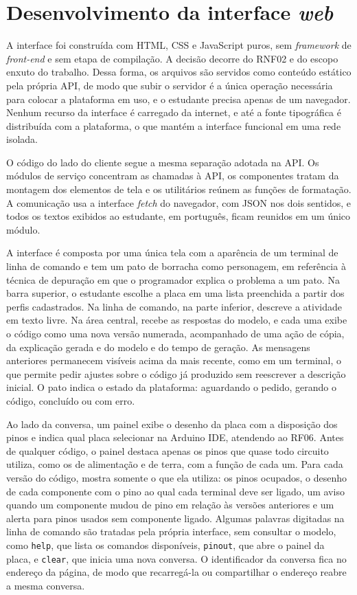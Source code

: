 \section{Desenvolvimento da interface \textit{web}}
\label{sec:method-web}

A interface foi construída com HTML, CSS e JavaScript puros, sem \textit{framework} de \textit{front-end} e sem etapa de compilação. A decisão decorre do RNF02 e do escopo enxuto do trabalho. Dessa forma, os arquivos são servidos como conteúdo estático pela própria API, de modo que subir o servidor é a única operação necessária para colocar a plataforma em uso, e o estudante precisa apenas de um navegador. Nenhum recurso da interface é carregado da internet, e até a fonte tipográfica é distribuída com a plataforma, o que mantém a interface funcional em uma rede isolada.

O código do lado do cliente segue a mesma separação adotada na API. Os módulos de serviço concentram as chamadas à API, os componentes tratam da montagem dos elementos de tela e os utilitários reúnem as funções de formatação. A comunicação usa a interface \textit{fetch} do navegador, com JSON nos dois sentidos, e todos os textos exibidos ao estudante, em português, ficam reunidos em um único módulo.

A interface é composta por uma única tela com a aparência de um terminal de linha de comando e tem um pato de borracha como personagem, em referência à técnica de depuração em que o programador explica o problema a um pato. Na barra superior, o estudante escolhe a placa em uma lista preenchida a partir dos perfis cadastrados. Na linha de comando, na parte inferior, descreve a atividade em texto livre. Na área central, recebe as respostas do modelo, e cada uma exibe o código como uma nova versão numerada, acompanhado de uma ação de cópia, da explicação gerada e do modelo e do tempo de geração. As mensagens anteriores permanecem visíveis acima da mais recente, como em um terminal, o que permite pedir ajustes sobre o código já produzido sem reescrever a descrição inicial. O pato indica o estado da plataforma: aguardando o pedido, gerando o código, concluído ou com erro.

Ao lado da conversa, um painel exibe o desenho da placa com a disposição dos pinos e indica qual placa selecionar na Arduino IDE, atendendo ao RF06. Antes de qualquer código, o painel destaca apenas os pinos que quase todo circuito utiliza, como os de alimentação e de terra, com a função de cada um. Para cada versão do código, mostra somente o que ela utiliza: os pinos ocupados, o desenho de cada componente com o pino ao qual cada terminal deve ser ligado, um aviso quando um componente mudou de pino em relação às versões anteriores e um alerta para pinos usados sem componente ligado. Algumas palavras digitadas na linha de comando são tratadas pela própria interface, sem consultar o modelo, como \texttt{help}, que lista os comandos disponíveis, \texttt{pinout}, que abre o painel da placa, e \texttt{clear}, que inicia uma nova conversa. O identificador da conversa fica no endereço da página, de modo que recarregá-la ou compartilhar o endereço reabre a mesma conversa.

